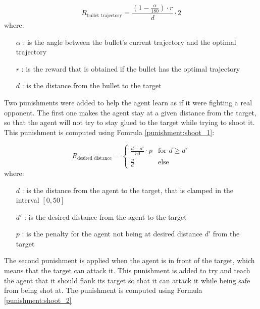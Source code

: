 \begin{equation} \label{bullet:1}
    R_\text{bullet trajectory} = \frac{(1 - \frac{\alpha}{180}) \cdot r}{d} \cdot 2
\end{equation}
where:
\begin{itemize}
    \item [$\alpha$]: is the angle between the bullet's current trajectory and the optimal trajectory
    \item [$r$]: is the reward that is obtained if the bullet has the optimal trajectory
    \item [$d$]: is the distance from the bullet to the target
\end{itemize}

Two punishments were added to help the agent learn as if it were fighting a real opponent. The first one makes the agent stay at a given distance from the target, so that the agent will not try to stay glued to the target while trying to shoot it. This punishment is computed using Fomrula \ref{punishment:shoot_1}:

\begin{equation} \label{punishment:shoot_1}
    R_\text{desired distance} = \begin{cases}
        \frac{d - d'}{50} \cdot p & \text{for } d \geq d' \\
        \frac{p}{d} & \text{else}
    \end{cases}
\end{equation}
where:
\begin{itemize}
    \item [$d$]: is the distance from the agent to the target, that is clamped in the interval $[0, 50]$
    \item [$d'$]: is the desired distance from the agent to the target
    \item [$p$]: is the penalty for the agent not being at desired distance $d'$ from the target
\end{itemize}

The second punishment is applied when the agent is in front of the target, which means that the target can attack it. This punishment is added to try and teach the agent that it should flank its target so that it can attack it while being safe from being shot at. The punishment is computed using Formula \ref{punishment:shoot_2}

